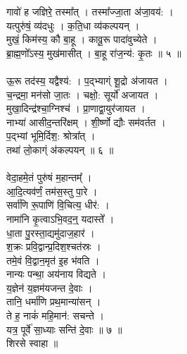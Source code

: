 गावो॑ ह जज्ञिरे॒ तस्मा᳚त् । तस्मा᳚ज्जा॒ता अ॑जा॒वय॑: ।\\
यत्पुरु॑षं॒ व्य॑दधुः । क॒ति॒धा व्य॑कल्पयन् ।\\
मुखं॒ किम॑स्य॒ कौ बा॒हू । कावू॒रू पादा॑वुच्येते ।\\
ब्रा॒ह्म॒णो᳚ऽस्य॒ मुख॑मासीत् । बा॒हू रा॑ज॒न्य॑: कृ॒तः ॥ ५ ॥\\
\\
ऊ॒रू तद॑स्य॒ यद्वैश्य॑: । प॒द्भ्याग्ं शू॒द्रो अ॑जायत ।\\
च॒न्द्रमा॒ मन॑सो जा॒तः । चक्षो॒: सूर्यो॑ अजायत ।\\
मुखा॒दिन्द्र॑श्चा॒ग्निश्च॑ । प्रा॒णाद्वा॒युर॑जायत ।\\
नाभ्या॑ आसीद॒न्तरि॑क्षम् । शी॒र्ष्णो द्यौः सम॑वर्तत ।\\
प॒द्भ्यां भूमि॒र्दिश॒: श्रोत्रा᳚त् ।\\
तथा॑ लो॒काग्ं अ॑कल्पयन् ॥ ६ ॥\\
\\
वेदा॒हमे॒तं पुरु॑षं म॒हान्तम्᳚ ।\\
आ॒दि॒त्यव॑र्णं॒ तम॑स॒स्तु पा॒रे ।\\
सर्वा॑णि रू॒पाणि॑ वि॒चित्य॒ धीर॑: ।\\
नामा॑नि कृ॒त्वाऽभि॒वद॒न्॒ यदास्ते᳚ ।\\
धा॒ता पु॒रस्ता॒द्यमु॑दाज॒हार॑ ।\\
श॒क्रः प्रवि॒द्वान्प्र॒दिश॒श्चत॑स्रः ।\\
तमे॒वं वि॒द्वान॒मृत॑ इ॒ह भ॑वति ।\\
नान्यः पन्था॒ अय॑नाय विद्यते ।\\
य॒ज्ञेन॑ य॒ज्ञम॑यजन्त दे॒वाः ।\\
तानि॒ धर्मा॑णि प्रथ॒मान्या॑सन् ।\\
ते ह॒ नाकं॑ महि॒मान॑: सचन्ते ।\\
यत्र॒ पूर्वे॑ सा॒ध्याः सन्ति॑ दे॒वाः ॥ ७ ॥\\
शिरसे स्वाहा ॥\\

